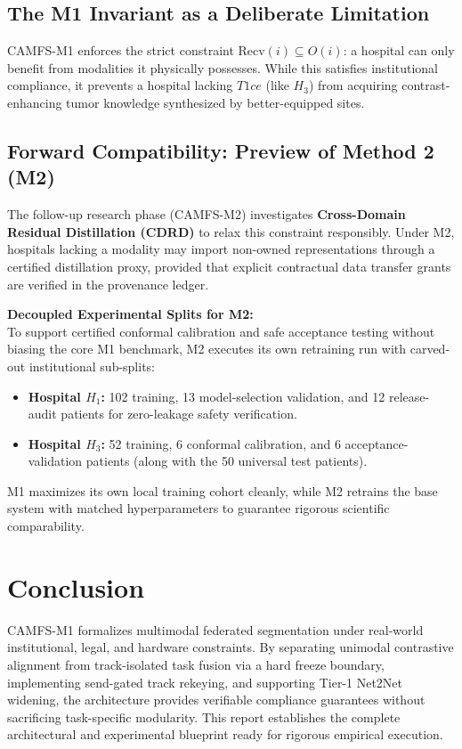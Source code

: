 \documentclass[10pt,a4paper]{article}
\begin{document}
\subsection{The M1 Invariant as a Deliberate Limitation}
CAMFS-M1 enforces the strict constraint $\text{Recv}(i) \subseteq O(i)$: a hospital can only benefit from modalities it physically possesses. While this satisfies institutional compliance, it prevents a hospital lacking $T1ce$ (like $H_3$) from acquiring contrast-enhancing tumor knowledge synthesized by better-equipped sites.

\subsection{Forward Compatibility: Preview of Method 2 (M2)}
The follow-up research phase (CAMFS-M2) investigates \textbf{Cross-Domain Residual Distillation (CDRD)} to relax this constraint responsibly. Under M2, hospitals lacking a modality may import non-owned representations through a certified distillation proxy, provided that explicit contractual data transfer grants are verified in the provenance ledger.

\noindent \textbf{Decoupled Experimental Splits for M2:}\\
To support certified conformal calibration and safe acceptance testing without biasing the core M1 benchmark, M2 executes its own retraining run with carved-out institutional sub-splits:
\begin{itemize}[itemsep=1pt, topsep=1pt]
    \item \textbf{Hospital $H_1$:} 102 training, 13 model-selection validation, and 12 release-audit patients for zero-leakage safety verification.
    \item \textbf{Hospital $H_3$:} 52 training, 6 conformal calibration, and 6 acceptance-validation patients (along with the 50 universal test patients).
\end{itemize}
M1 maximizes its own local training cohort cleanly, while M2 retrains the base system with matched hyperparameters to guarantee rigorous scientific comparability.

\section{Conclusion}
CAMFS-M1 formalizes multimodal federated segmentation under real-world institutional, legal, and hardware constraints. By separating unimodal contrastive alignment from track-isolated task fusion via a hard freeze boundary, implementing send-gated track rekeying, and supporting Tier-1 Net2Net widening, the architecture provides verifiable compliance guarantees without sacrificing task-specific modularity. This report establishes the complete architectural and experimental blueprint ready for rigorous empirical execution.
\end{document}
